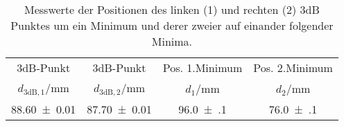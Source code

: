 \begin{table}[!h]
	\centering
	\begin{tabular}{cccc}
		\toprule
		3dB-Punkt & 3dB-Punkt & Pos. 1.Minimum & Pos. 2.Minimum\\
		$d_{3\mathrm{dB},1}$/\si{mm} & $d_{3\mathrm{dB},2}$/\si{mm} & $d_1$/\si{mm} & $d_2$/\si{mm}\\
\midrule
		\num{88.60(1)} & \num{87.70(1)} & \num{96.0(1)} & \num{76.0(1)}\\
		\bottomrule
	\end{tabular}
	\caption{ Messwerte der Positionen des linken (1) und rechten (2) 3dB Punktes um ein Minimum
                    und derer zweier auf einander folgender Minima. \label{tab:SWR_3dB_Methode}}
\end{table}
